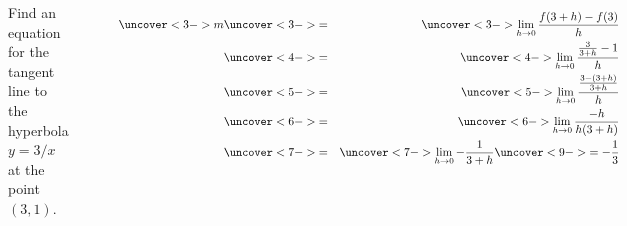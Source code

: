 \begin{frame}
\begin{example}[Example 2, p. 113]
\begin{columns}[c]
Find an equation for the tangent line to the hyperbola $y = 3/x$ at the point $(3,1)$.

\ %
%

%
\begin{eqnarray*}
\uncover<3->{m} & \uncover<3->{ = } & \uncover<3->{\lim_{h\rightarrow 0} \frac{f(3+ h)-f(3)}{h}}\\
& \uncover<4->{ = } & %
\uncover<4->{\lim_{h\rightarrow 0}\frac{\frac{3}{3+h} - 1}{h}}\\
& \uncover<5->{ = } & %
\uncover<5->{\lim_{h\rightarrow 0}\frac{\frac{3-(3+h)}{3+h}}{h}}\\
& \uncover<6->{ = } & %
\uncover<6->{\lim_{h\rightarrow 0}\frac{-h}{h(3+h)}}\\
& \uncover<7->{ = } & %
\uncover<7->{\lim_{h\rightarrow 0}-\frac{1}{3+h}}\uncover<9->{ = -\frac{1}{3}}
\end{eqnarray*}
\end{columns}
\end{example}
\end{frame}
